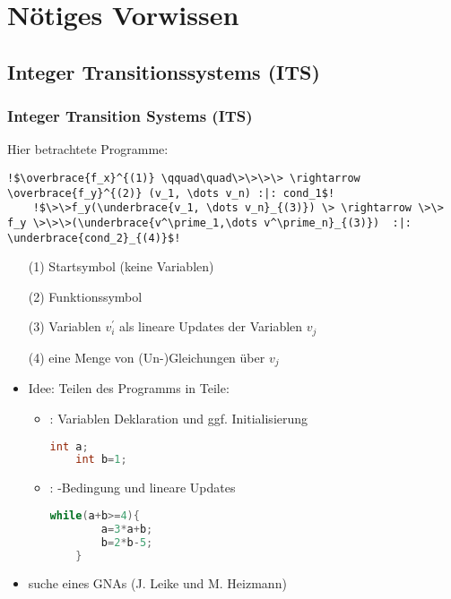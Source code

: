 \section{N{\"o}tiges Vorwissen}

\subsection{Integer Transitionssystems (ITS) }
\frame{\tableofcontents[currentsection]}
\begin{frame}[fragile] %
	\frametitle{Integer Transition Systems (ITS)}
	Hier betrachtete Programme:
	\begin{lstlisting}[escapechar=!]
	!$\overbrace{f_x}^{(1)} \qquad\quad\>\>\>\> \rightarrow \overbrace{f_y}^{(2)} (v_1, \dots v_n) :|: cond_1$!
	!$\>\>f_y(\underbrace{v_1, \dots v_n}_{(3)}) \> \rightarrow \>\> f_y \>\>\>(\underbrace{v^\prime_1,\dots v^\prime_n}_{(3)})  :|: \underbrace{cond_2}_{(4)}$!
	\end{lstlisting}
	
	\begin{enumerate}
		\item[(1)] Startsymbol (keine Variablen)
		\item[(2)] Funktionssymbol
		\item[(3)] Variablen $v^\prime_i$ als lineare Updates der Variablen $v_j$
		\item[(4)] eine Menge von (Un-)Gleichungen \"uber $v_j$
	\end{enumerate}
\end{frame}


\begin{frame}[fragile]
	\begin{itemize}
		\item Idee: Teilen des Programms in  Teile:
			\begin{itemize}
				\item \stem: Variablen Deklaration und ggf. Initialisierung
					\begin{lstlisting}[language = java]
	int a;
	int b=1;
					\end{lstlisting}
				\item \loopt: -Bedingung und lineare Updates
				\begin{lstlisting}[language = java]
	while(a+b>=4){
		a=3*a+b;
		b=2*b-5;
	}
				\end{lstlisting}
			\end{itemize}
		\item suche eines GNAs (J. Leike und M. Heizmann)
	\end{itemize}
\end{frame}

